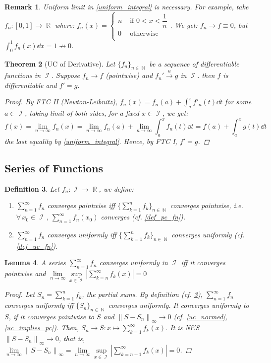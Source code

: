 \documentclass[12pt]{article}
\newcommand{\Forall}[1]{\forall\,{#1}\,,\,}
\DeclareMathOperator{\R}{\mathbb{R}}
\DeclareMathOperator{\N}{\mathbb{N}}
\DeclareMathOperator{\I}{\mathcal{I}}
\newcommand{\seq}[2]{\{{#1}\}_{#2\in\N}}
\newcommand{\fsup}[1]{\left\|#1\right\|_\infty}
\newcommand{\uto}[0]{\overset{\displaystyle u}{\longrightarrow}}
\newtheorem{theorem}{Theorem}[subsection]
\newtheorem{definition}[theorem]{Definition}
\newtheorem{lemma}[theorem]{Lemma}
\newtheorem{remark}[theorem]{Remark}
\begin{document}
\begin{remark}
  Uniform limit in \ref{uniform_integral} is necessary. For example, take $f_n:[0,1]\to\R$ where: $f_n(x)=\begin{cases}
    n &\text{ if }0<x<\dfrac{1}{n}\\
    0 &\text{ otherwise}\\
  \end{cases}$. We get: $f_n\to f\equiv 0$, but $\displaystyle\int_0^1 f_n(x)\dd{x}=1\not\to 0$.
\end{remark}

\begin{theorem}[UC of Derivative]
  \label{uniform_derivative}
  Let $\seq{f_n}{n}$ be a sequence of differentiable functions in $\I$. Suppose $f_n\to f$ (pointwise) and $f_n'\uto g$ in $\I$. then $f$ is differentiable and $f'=g$.
  \begin{proof}
    By FTC II (Newton-Leibnitz), $\displaystyle f_n(x)=f_n(a)+\int_a^x f'_n(t)\dd{t}$ for some $a\in\I$, taking limit of both sides, for a fixed $x\in\I$, we get: $$f(x)=\lim_{n\to\infty}f_n(x)=\lim_{n\to\infty}f_n(a)+\lim_{n\to\infty}\int_a^x f_n(t)\dd{t}=f(a)+\int_a^x g(t)\dd{t}$$ the last equality by \ref{uniform_integral}. Hence, by FTC I, $f'=g$.
  \end{proof}
\end{theorem}

\pagebreak

\subsection{Series of Functions}

\begin{definition}
  \label{def_uc_series}
  Let $f_n:\I\to\R$, we define: 
  \begin{enumerate}
    \item $\sum_{n=1}^\infty f_n$ converges pointwise iff $\seq{\sum_{k=1}^n f_k}{n}$ converges pointwise, i.e. $\Forall{x_0\in\I}\sum_{n=1}^\infty f_n(x_0)$ converges (cf. \ref{def_pc_fn}).
    \item $\sum_{n=1}^\infty f_n$ converges uniformly iff $\seq{\sum_{k=1}^n f_k}{n}$ converges uniformly (cf. \ref{def_uc_fn}).
  \end{enumerate}
\end{definition}

\begin{lemma}
  A series $\sum_{n=1}^\infty f_n$ converges uniformly in $\I$ iff it converges pointwise and $\lim\limits_{n\to\infty}\sup\limits_{x\in\I}\left|\sum_{k=n}^\infty f_k(x)\right|=0$
  \begin{proof}
    Let $S_n=\sum_{k=1}^n f_k$, the partial sums. By definition (cf. \ref{def_uc_series}), $\sum_{n=1}^\infty f_n$ converges uniformly iff $\seq{S_n}{n}$ converges uniformly. It converges uniformly to $S$, if it converges pointwise to $S$ and $\fsup{S-S_n}\to 0$ (cf. \ref{uc_normed},\ref{uc_implies_pc}). Then, $S_n\to S:x\mapsto \sum_{k=1}^\infty f_k(x)$. It is N\&S $\fsup{S-S_n}\to 0$, that is, $\lim\limits_{n\to\infty}\fsup{S-S_n}=\lim\limits_{n\to\infty}\sup\limits_{x\in\I}\left|\sum_{k=n+1}^\infty f_k(x)\right|=0$.
  \end{proof}
\end{lemma}
\end{document}
